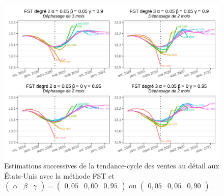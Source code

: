 \documentclass[
  12pt,
  a4paper,french]{article}
\newcommand\1{\mathds{1}}
\begin{document}
\begin{figure}

{\centering \includegraphics[width=0.9\linewidth]{img/nber/retailx_fstp1} 

}

\caption[Estimations successives de la tendance-cycle des ventes au détail aux États-Unis avec la méthode FST et \(\begin{pmatrix}\alpha&\beta&\gamma\end{pmatrix} = \begin{pmatrix}0,05 &0,00&0,95\end{pmatrix}\) ou \(\begin{pmatrix}0,05 &0,05&0,90\end{pmatrix}\)]{Estimations successives de la tendance-cycle des ventes au détail aux États-Unis avec la méthode FST et \(\begin{pmatrix}\alpha&\beta&\gamma\end{pmatrix} = \begin{pmatrix}0,05 &0,00&0,95\end{pmatrix}\) ou \(\begin{pmatrix}0,05 &0,05&0,90\end{pmatrix}\).}\label{fig:retailxfst1}

\footnotesize
\normalsize\end{figure}
\end{document}
